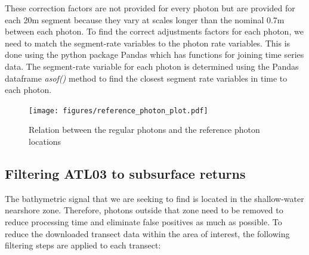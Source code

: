 These correction factors are not provided for every photon but are provided for each 20m segment because they vary at scales longer than the nominal 0.7m between each photon. To find the correct adjustments factors for each photon, we need to match the segment-rate variables to the photon rate variables. This is done using the python package Pandas \parencite{jeff_reback_2022_6408044,mckinney-proc-scipy-2010} which has functions for joining time series data.  The segment-rate variable for each photon is determined using the Pandas dataframe \emph{asof()} method to find the closest segment rate variables in time to each photon. 

\begin{figure}[h]
    \centering
    \texttt{[image: figures/reference\_photon\_plot.pdf]}
    \caption{Relation between the regular photons and the reference photon locations}
    \label{fig:reference-photon_match} 
\end{figure}

\subsection{Filtering ATL03 to subsurface returns}

The bathymetric signal that we are seeking to find is located in the shallow-water nearshore zone. Therefore, photons outside that zone need to be removed to reduce processing time and eliminate false positives as much as possible. To reduce the downloaded transect data within the area of interest, the following filtering steps are applied to each transect:

